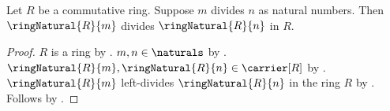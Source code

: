 \begin{corollary}\label{commutative_ring_natural_divisibility}
    Let $R$ be a commutative ring.
    Suppose $m$ divides $n$ as natural numbers.
    Then $\ringNatural{R}{m}$ divides $\ringNatural{R}{n}$ in $R$.
\end{corollary}
\begin{proof}
    $R$ is a ring by .
    $m,n\in\naturals$ by
        .
    $\ringNatural{R}{m},\ringNatural{R}{n}\in\carrier[R]$ by
        .
    $\ringNatural{R}{m}$ left-divides $\ringNatural{R}{n}$
        in the ring $R$ by
        .
    Follows by .
\end{proof}
